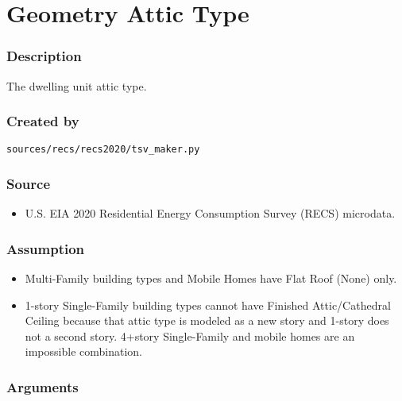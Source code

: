 \section{Geometry Attic Type}\label{geometry_attic_type}

\subsubsection{Description}\label{description-43}

The dwelling unit attic type.

\subsubsection{Created by}\label{created-by-43}

\texttt{sources/recs/recs2020/tsv\_maker.py}

\subsubsection{Source}\label{source-42}

\begin{itemize}
 
\item
  U.S. EIA 2020 Residential Energy Consumption Survey (RECS) microdata.
\end{itemize}

\subsubsection{Assumption}\label{assumption-23}

\begin{itemize}
 
\item
  Multi-Family building types and Mobile Homes have Flat Roof (None)
  only.
\item
  1-story Single-Family building types cannot have Finished
  Attic/Cathedral Ceiling because that attic type is modeled as a new
  story and 1-story does not a second story. 4+story Single-Family and
  mobile homes are an impossible combination.
\end{itemize}

\subsubsection{Arguments}\label{arguments-27}

